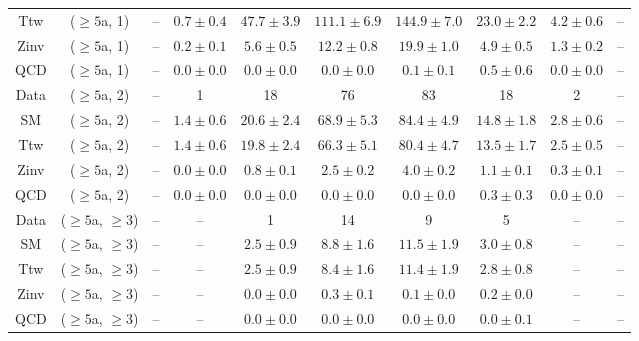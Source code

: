 \begin{table}[h!]
{\begin{tabular}{cccccccccc}
	Ttw & ($\ge5$a, 1) & -- & $0.7\pm 0.4$ & $47.7\pm 3.9$ & $111.1\pm 6.9$ & $144.9\pm 7.0$ & $23.0\pm 2.2$ & $4.2\pm 0.6$ & -- \\[0.5ex] 
	Zinv & ($\ge5$a, 1) & -- & $0.2\pm 0.1$ & $5.6\pm 0.5$ & $12.2\pm 0.8$ & $19.9\pm 1.0$ & $4.9\pm 0.5$ & $1.3\pm 0.2$ & -- \\[0.5ex] 
	QCD & ($\ge5$a, 1) & -- & $0.0\pm 0.0$ & $0.0\pm 0.0$ & $0.0\pm 0.0$ & $0.1\pm 0.1$ & $0.5\pm 0.6$ & $0.0\pm 0.0$ & -- \\[0.5ex] 
	Data & ($\ge5$a, 2) & -- & 1 & 18 & 76 & 83 & 18 & 2 & -- \\[0.5ex] 
	SM & ($\ge5$a, 2) & -- & $1.4\pm 0.6$ & $20.6\pm 2.4$ & $68.9\pm 5.3$ & $84.4\pm 4.9$ & $14.8\pm 1.8$ & $2.8\pm 0.6$ & -- \\[0.5ex] 
	Ttw & ($\ge5$a, 2) & -- & $1.4\pm 0.6$ & $19.8\pm 2.4$ & $66.3\pm 5.1$ & $80.4\pm 4.7$ & $13.5\pm 1.7$ & $2.5\pm 0.5$ & -- \\[0.5ex] 
	Zinv & ($\ge5$a, 2) & -- & $0.0\pm 0.0$ & $0.8\pm 0.1$ & $2.5\pm 0.2$ & $4.0\pm 0.2$ & $1.1\pm 0.1$ & $0.3\pm 0.1$ & -- \\[0.5ex] 
	QCD & ($\ge5$a, 2) & -- & $0.0\pm 0.0$ & $0.0\pm 0.0$ & $0.0\pm 0.0$ & $0.0\pm 0.0$ & $0.3\pm 0.3$ & $0.0\pm 0.0$ & -- \\[0.5ex] 
	Data & ($\ge5$a, $\ge3$) & -- & -- & 1 & 14 & 9 & 5 & -- & -- \\[0.5ex] 
	SM & ($\ge5$a, $\ge3$) & -- & -- & $2.5\pm 0.9$ & $8.8\pm 1.6$ & $11.5\pm 1.9$ & $3.0\pm 0.8$ & -- & -- \\[0.5ex] 
	Ttw & ($\ge5$a, $\ge3$) & -- & -- & $2.5\pm 0.9$ & $8.4\pm 1.6$ & $11.4\pm 1.9$ & $2.8\pm 0.8$ & -- & -- \\[0.5ex] 
	Zinv & ($\ge5$a, $\ge3$) & -- & -- & $0.0\pm 0.0$ & $0.3\pm 0.1$ & $0.1\pm 0.0$ & $0.2\pm 0.0$ & -- & -- \\[0.5ex] 
	QCD & ($\ge5$a, $\ge3$) & -- & -- & $0.0\pm 0.0$ & $0.0\pm 0.0$ & $0.0\pm 0.0$ & $0.0\pm 0.1$ & -- & -- \\[0.5ex] 
	\hline
	\hline
\end{tabular}}
\end{table}
